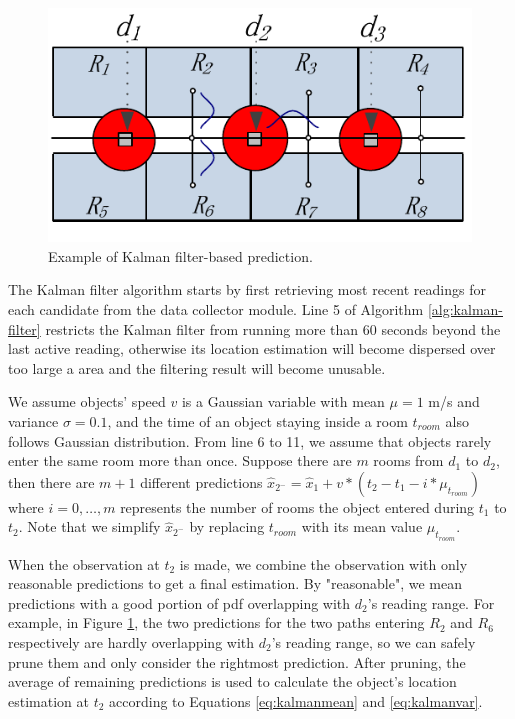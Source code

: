 \documentclass[12pt]{report}
\begin{document}
\begin{figure}[htbp]
\centering
\includegraphics[width=.5\textwidth]{img/kalman-example.pdf}
\caption{\label{fig:kalman-filter}
Example of Kalman filter-based prediction.}
\end{figure}

The Kalman filter algorithm starts by first retrieving most recent
readings for each candidate from the data collector module.  Line
5 of Algorithm \ref{alg:kalman-filter} restricts the Kalman filter
from running more than 60 seconds beyond the last active reading,
otherwise its location estimation will become dispersed over too
large a area and the filtering result will become unusable.

We assume objects' speed \(v\) is a Gaussian variable with mean
\(\mu=1\) m/s and variance \(\sigma=0.1\), and the time of an
object staying inside a room \(t_{room}\) also follows Gaussian
distribution.  From line 6 to 11, we assume that objects rarely
enter the same room more than once.  Suppose there are \(m\) rooms
from \(d_1\) to \(d_2\), then there are \(m+1\) different
predictions \(\hat{x}_{2^-} = \hat{x}_1 + v * (t_2 - t_1-i *
    \mu_{t_{room}})\) where \(i=0,\ldots,m\) represents the number of
rooms the object entered during \(t_1\) to \(t_2\).  Note that we
simplify \(\hat{x}_{2^-}\) by replacing \(t_{room}\) with its mean
value \(\mu_{t_{room}}\).

When the observation at \(t_2\) is made, we combine the
observation with only reasonable predictions to get a final
estimation. By "reasonable", we mean predictions with a good
portion of pdf overlapping with \(d_2\)'s reading range.  For
example, in Figure \ref{fig:kalman-filter}, the two predictions for the
two paths entering \(R_2\) and \(R_6\) respectively are hardly
overlapping with \(d_2\)'s reading range, so we can safely prune
them and only consider the rightmost prediction.  After pruning,
the average of remaining predictions is used to calculate the
object's location estimation at \(t_2\) according to Equations
\eqref{eq:kalmanmean} and \eqref{eq:kalmanvar}.
\end{document}
